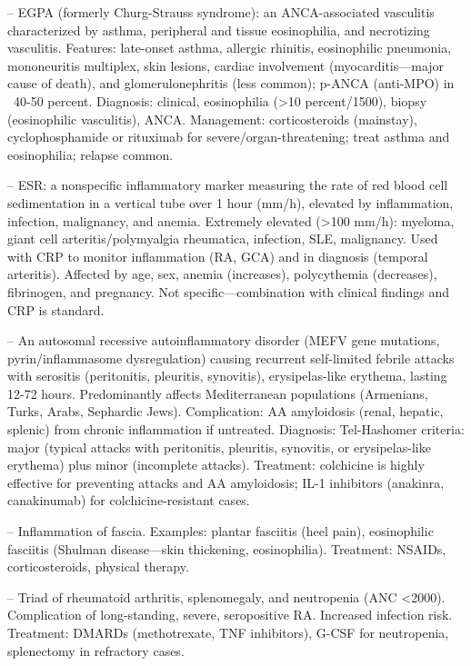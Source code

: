 -- EGPA (formerly Churg-Strauss syndrome): an ANCA-associated vasculitis characterized by asthma, peripheral and tissue eosinophilia, and necrotizing vasculitis. Features: late-onset asthma, allergic rhinitis, eosinophilic pneumonia, mononeuritis multiplex, skin lesions, cardiac involvement (myocarditis—major cause of death), and glomerulonephritis (less common); p-ANCA (anti-MPO) in ~40-50 percent. Diagnosis: clinical, eosinophilia (>10 percent/1500), biopsy (eosinophilic vasculitis), ANCA. Management: corticosteroids (mainstay), cyclophosphamide or rituximab for severe/organ-threatening; treat asthma and eosinophilia; relapse common.

-- ESR: a nonspecific inflammatory marker measuring the rate of red blood cell sedimentation in a vertical tube over 1 hour (mm/h), elevated by inflammation, infection, malignancy, and anemia. Extremely elevated (>100 mm/h): myeloma, giant cell arteritis/polymyalgia rheumatica, infection, SLE, malignancy. Used with CRP to monitor inflammation (RA, GCA) and in diagnosis (temporal arteritis). Affected by age, sex, anemia (increases), polycythemia (decreases), fibrinogen, and pregnancy. Not specific—combination with clinical findings and CRP is standard.

-- An autosomal recessive autoinflammatory disorder (MEFV gene mutations, pyrin/inflammasome dysregulation) causing recurrent self-limited febrile attacks with serositis (peritonitis, pleuritis, synovitis), erysipelas-like erythema, lasting 12-72 hours. Predominantly affects Mediterranean populations (Armenians, Turks, Arabs, Sephardic Jews). Complication: AA amyloidosis (renal, hepatic, splenic) from chronic inflammation if untreated. Diagnosis: Tel-Hashomer criteria: major (typical attacks with peritonitis, pleuritis, synovitis, or erysipelas-like erythema) plus minor (incomplete attacks). Treatment: colchicine is highly effective for preventing attacks and AA amyloidosis; IL-1 inhibitors (anakinra, canakinumab) for colchicine-resistant cases.

-- Inflammation of fascia. Examples: plantar fasciitis (heel pain), eosinophilic fasciitis (Shulman disease—skin thickening, eosinophilia). Treatment: NSAIDs, corticosteroids, physical therapy.

-- Triad of rheumatoid arthritis, splenomegaly, and neutropenia (ANC <2000). Complication of long-standing, severe, seropositive RA. Increased infection risk. Treatment: DMARDs (methotrexate, TNF inhibitors), G-CSF for neutropenia, splenectomy in refractory cases.

